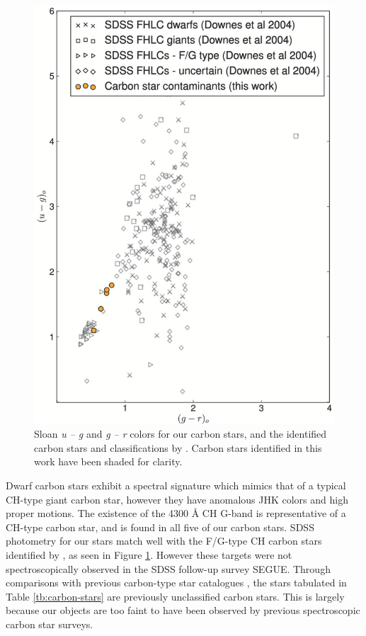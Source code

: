 \documentclass[preprint2]{aastex}
\begin{document}
\begin{figure}[h!]
	\includegraphics[width=\columnwidth]{./carbon_stars.eps}
	\caption{Sloan \textit{u \--- g} and \textit{g \--- r} colors for our carbon stars, and the identified carbon stars and classifications by \citet{Downes;et-al_2004}. Carbon stars identified in this work have been shaded for clarity.}
	\label{fig:carbon-sdss}
\end{figure}

	 Dwarf carbon stars exhibit a spectral signature which mimics that of a typical CH-type giant carbon star, however they have anomalous JHK colors \citep{Green;et-al_1992} and high proper motions. The existence of the 4300 \AA{} CH G-band is representative of a CH-type carbon star, and is found in all five of our carbon stars. SDSS photometry for our stars match well with the F/G-type CH carbon stars identified by \citet{Downes;et-al_2004}, as seen in Figure \ref{fig:carbon-sdss}. However these targets were not spectroscopically observed in the SDSS follow-up survey SEGUE.  Through comparisons with previous carbon-type star catalogues \citep{Totten;Irwin_1998, Downes;et-al_2004, Goswami;et-al_2010}, the stars tabulated in Table \ref{tb:carbon-stars} are previously unclassified carbon stars. This is largely because our objects are too faint to have been observed by previous spectroscopic carbon star surveys.
	
\end{document}

